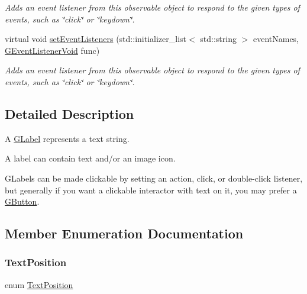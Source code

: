 \begin{DoxyCompactItemize}
\begin{DoxyCompactList}\small\item\em Adds an event listener from this observable object to respond to the given types of events, such as \char`\"{}click\char`\"{} or \char`\"{}keydown\char`\"{}. \end{DoxyCompactList}\item 
virtual void \mbox{\hyperlink{classsgl_1_1GObservable_a7867184bbb686f74fae8a4db927da799}{set\+Event\+Listeners}} (std\+::initializer\+\_\+list$<$ std\+::string $>$ event\+Names, \mbox{\hyperlink{namespacesgl_a54427ce97bb1c2804e4fe2b0a62e8b17}{G\+Event\+Listener\+Void}} func)
\begin{DoxyCompactList}\small\item\em Adds an event listener from this observable object to respond to the given types of events, such as \char`\"{}click\char`\"{} or \char`\"{}keydown\char`\"{}. \end{DoxyCompactList}\end{DoxyCompactItemize}


\subsection{Detailed Description}
A \mbox{\hyperlink{classsgl_1_1GLabel}{G\+Label}} represents a text string. 

A label can contain text and/or an image icon.

G\+Labels can be made clickable by setting an action, click, or double-\/click listener, but generally if you want a clickable interactor with text on it, you may prefer a \mbox{\hyperlink{classsgl_1_1GButton}{G\+Button}}. 

\subsection{Member Enumeration Documentation}
\mbox{\label{classsgl_1_1GInteractor_a8e0d441725a81d2bbdebbea09078260e}} 
\subsubsection{\texorpdfstring{Text\+Position}{TextPosition}}
{\footnotesize\ttfamily enum \mbox{\hyperlink{classsgl_1_1GInteractor_a8e0d441725a81d2bbdebbea09078260e}{Text\+Position}}\hspace{0.3cm}{\ttfamily [inherited]}}



